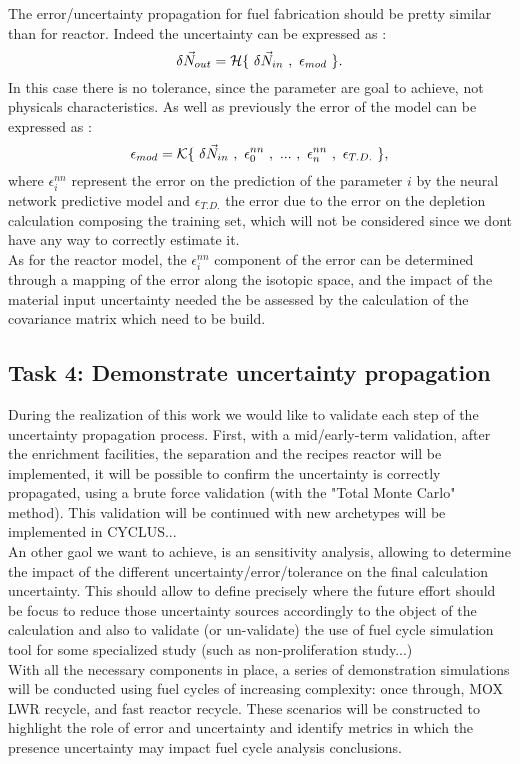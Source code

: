 \documentclass[dvips,12pt]{article}
\begin{document}
The error/uncertainty propagation for fuel
fabrication should be pretty similar than for
reactor. Indeed the uncertainty can be expressed
as :
\begin{equation}
\delta \vec{N}_{out} = {\cal H}\{~\delta\vec{N}_{in}~,~\epsilon_{mod}~\}.
\end{equation}
In this case there is no tolerance, since the
parameter are goal to achieve, not physicals
characteristics. As well as previously the error
of the model can be expressed as :
\begin{equation}
\epsilon_{mod} = {\cal K}\{~\delta\vec{N}_{in}~,~\epsilon^{nn}_{0}~,~...~,~\epsilon^{nn}_{n}~,~\epsilon_{T.D.}~\},
\end{equation}
 where $\epsilon^{nn}_{i}$ represent the error on
 the prediction of the parameter $i$ by the neural
 network predictive model and $\epsilon_{T.D.}$
 the error due to the error on the depletion
 calculation composing the training set, which
 will not be considered since we dont have any way
 to correctly estimate it.\\
 
 As for the reactor model, the $\epsilon^{nn}_{i}$
 component of the error can be determined through
 a mapping of the error along the isotopic space,
 and the impact of the material input uncertainty
 needed the be assessed by the calculation of the
 covariance matrix which need to be build.

\subsection{Task 4: Demonstrate uncertainty propagation}
During the realization of this work we would like
to validate each step of the uncertainty
propagation process. First, with a mid/early-term
validation, after the enrichment facilities, the
separation and the recipes reactor will be
implemented, it will be possible to confirm the
uncertainty is correctly propagated, using a brute
force validation (with the "Total Monte Carlo"
method). This validation will be continued with
new archetypes will be implemented in CYCLUS...\\
An other gaol we want to achieve, is an
sensitivity analysis, allowing to determine the
impact of the different
uncertainty/error/tolerance on the final
calculation uncertainty. This should allow to
define precisely where the future effort should be
focus to reduce those uncertainty sources
accordingly to the object of the calculation and
also to validate (or un-validate) the use of fuel
cycle simulation tool for some specialized study
(such as non-proliferation study...)\\
With all the necessary components in place, a
series of demonstration simulations will be
conducted using fuel cycles of increasing
complexity: once through, MOX LWR recycle, and
fast reactor recycle.  These scenarios will be
constructed to highlight the role of error and
uncertainty and identify metrics in which the
presence uncertainty may impact fuel cycle
analysis conclusions.
\end{document}
